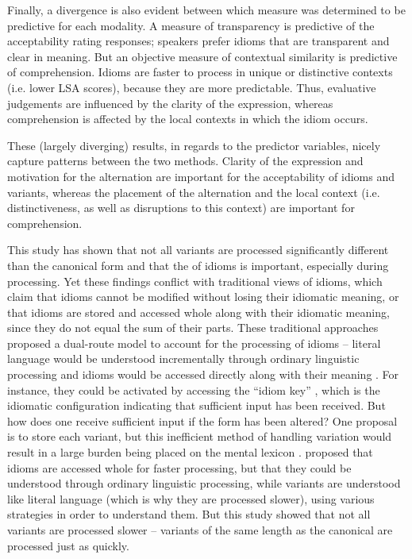 \documentclass[output=paper
,modfonts
,nonflat]{langsci/langscibook}
\begin{document}
Finally, a divergence is also evident between which  measure was determined to be predictive for each modality. A measure of transparency is predictive of the acceptability rating responses; speakers prefer idioms that are transparent and clear in meaning. But an objective measure of contextual similarity is predictive of comprehension. Idioms are faster to process in unique or distinctive contexts (i.e. lower LSA scores), because they are more predictable. Thus, evaluative judgements are influenced by the clarity of the expression, whereas comprehension is affected by the local contexts in which the idiom occurs.

These (largely diverging) results,  in regards to the predictor variables, nicely capture patterns between the two methods. Clarity of the expression and motivation for the alternation are important for the acceptability of idioms and variants, whereas the placement of the alternation and the local context (i.e. distinctiveness, as well as disruptions to this context) are important for comprehension.

This study has shown that not all variants are processed significantly different than the canonical form and that the  of idioms is important, especially during processing. Yet these findings conflict with traditional views of idioms, which claim that idioms cannot be modified without losing their idiomatic meaning, or that idioms are stored and accessed whole along with their idiomatic meaning, since they do not equal the sum of their parts. These traditional approaches proposed a dual-route model to account for the processing of idioms -- literal language would be understood incrementally through ordinary linguistic processing and idioms would be accessed directly along with their meaning \citep[cf.][]{SwinneyCutler1979, CacciariTabossi1988}. For instance, they could be activated by accessing the ``idiom key'' \citep{CacciariTabossi1988}, which is the idiomatic configuration indicating that sufficient input has been received. But how does one receive sufficient input if the form has been altered? One proposal is to store each variant, but this inefficient method of handling variation would result in a large burden being placed on the mental lexicon \citep{BaayenEtAl2013}. \citet{McGloneEtAl1994} proposed that idioms are accessed whole for faster processing, but that they could be understood through ordinary linguistic processing, while variants are understood like literal language (which is why they are processed slower), using various strategies in order to understand them. But this study showed that not all variants are processed slower -- variants of the same length as the canonical are processed just as quickly.
\end{document}
